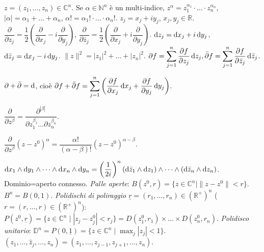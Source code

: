 $z=(z_1, \dots, z_n) \in \mathbb{C}^n$. Se $\alpha \in \mathbb{N}^n$ è un multi-indice, $z^{\alpha}=z_1^{\alpha_1}\cdot \ldots \cdot z_n^{\alpha_n}$, $|\alpha|=\alpha_1+\dots+\alpha_n$, $\alpha!=\alpha_1!\cdot\ldots\cdot\alpha_n!$.
$z_j=x_j+iy_j$, $x_j,y_j \in \mathbb{R}$. $\dfrac{\partial}{\partial z_j}=\dfrac{1}{2}\left(\dfrac{\partial}{\partial x_j}-i\dfrac{\partial}{\partial y_j}\right)$, $\dfrac{\partial}{\partial\bar{z}_j}=\dfrac{1}{2}\left(\dfrac{\partial}{\partial x_j}+i\dfrac{\partial}{\partial y_j}\right)$.
$\mathop{}\!\mathrm{d} z_j=\mathop{}\!\mathrm{d} x_j+i\mathop{}\!\mathrm{d} y_j$, $\mathop{}\!\mathrm{d}\bar{z}_j=\mathop{}\!\mathrm{d} x_j-i\mathop{}\!\mathrm{d} y_j$. $\|z\|^2=|z_1|^2+\dots+|z_n|^2$. $\displaystyle \partial f=\sum_{j=1}^n \dfrac{\partial f}{\partial z_j}\mathop{}\!\mathrm{d} z_j, \bar{\partial} f=\sum_{j=1}^n \dfrac{\partial f}{\partial \bar{z}_j}\mathop{}\!\mathrm{d} \bar{z}_j$.

\begin{exc}
  $\partial+\bar{\partial}=\mathop{}\!\mathrm{d}$, cioè $\displaystyle \partial f+\bar{\partial}f=\sum_{j=1}^n \left(\dfrac{\partial f}{\partial x_j}\mathop{}\!\mathrm{d} x_j+\dfrac{\partial f}{\partial y_j}\mathop{}\!\mathrm{d} y_j\right)$.
\end{exc}

$\dfrac{\partial}{\partial z^\beta}=\dfrac{\partial^{|\beta|}}{\partial z_1^{\beta_1}\dots\partial z_n^{\beta_n}}$.

\begin{exc}
  $\dfrac{\partial}{\partial z^\beta}(z-z^0)^\alpha=\dfrac{\alpha!}{(\alpha-\beta)!}(z-z^0)^{\alpha-\beta}$.
\end{exc}

$\diff x_1 \wedge \diff y_1 \wedge \dots \wedge \diff x_n \wedge \diff y_n=\left(\dfrac{1}{2i}\right)^n(\diff\bar{z}_1\wedge \diff z_1)\wedge \dots \wedge (\diff\bar{z}_n \wedge \diff z_n)$.
Dominio=aperto connesso. \textit{Palle aperte}: $B(z^0, r)=\{z \in \mathbb{C}^n \mid \|z-z^0\|<r\}$. $B^n=B(0,1)$.
\textit{Polidischi di poliraggio $\underline{r}=(r_1,\dots,r_n) \in (\mathbb{R}^+)^n$} ($r=(r, \dots, r) \in (\mathbb{R}^+)^n$): $P(z^0, \underline{r})=\{z \in \mathbb{C}^n \mid |z_j-z_j^0|<r_j\}=D(z_1^0, r_1) \times \dots \times D(z_n^0, r_n)$.
\textit{Polidisco unitario}: $\displaystyle \mathbb{D}^n=P(0, \underline{1})=\{z \in \mathbb{C}^n \mid \max_j |z_j|<1\}$. $(z_1, \dots, \hat{z}_j,\dots, z_n)=(z_1, \dots, z_{j-1}, z_{j+1}, \dots, z_n)$.


